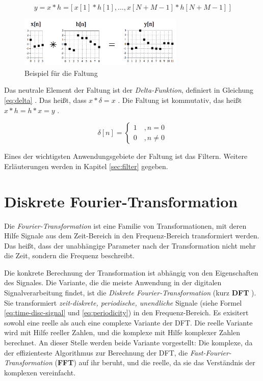 \begin{equation}
y = x * h = \big[ \: x[1] * h[1] , \ldots , x[N+M-1] * h[N+M-1] \: \big]
\label{eq:convolution}
\end{equation}

\begin{figure}[h]
	\centering
	\includegraphics[width=0.7\textwidth]{bilder/convolutionExample.png}
	\caption{Beispiel für die Faltung}
	\label{img:convolutionExample}
\end{figure}

Das neutrale Element der Faltung ist der \emph{Delta-Funktion}, definiert in Gleichung \ref{eq:delta} . Das heißt, dass $x * \delta = x$ . Die Faltung ist kommutativ, das heißt $ x * h = h * x = y$ . \cite[S. 107, 113 ]{dspGuide}

\begin{equation}
\delta[n] = 
\begin{cases}
1 \quad , n = 0\\
0 \quad ,  n \neq 0
\label{eq:delta}
\end{cases}
\end{equation}

Eines der wichtigsten Anwendungsgebiete der Faltung ist das Filtern. Weitere Erläuterungen werden in Kapitel \ref{sec:filter} gegeben.


\section{Diskrete Fourier-Transformation}

Die \emph{Fourier-Transformation} ist eine Familie von Transformationen, mit deren Hilfe Signale aus dem Zeit-Bereich in den Frequenz-Bereich transformiert werden. Das heißt, dass der unabhängige Parameter nach der Transformation nicht mehr die Zeit, sondern die Frequenz beschreibt. 

Die konkrete Berechnung der Transformation ist abhängig von den Eigenschaften des Signales. Die Variante, die die meiste Anwendung in der digitalen Signalverarbeitung findet, ist die \emph{Diskrete Fourier-Transformation} (kurz \textbf{DFT} ). Sie transformiert \emph{zeit-diskrete, periodische, unendliche} Signale (siehe Formel \ref{eq:time-disc-signal} und \ref{eq:periodicity}) in den Frequenz-Bereich. Es exisitert sowohl eine reelle als auch eine complexe Variante der DFT. Die reelle Variante wird mit Hilfe reeller Zahlen, und die komplexe mit Hilfe komplexer Zahlen berechnet. An dieser Stelle werden beide Variante vorgestellt: Die komplexe, da der effizienteste Algorithmus zur Berechnung der DFT, die \emph{Fast-Fourier-Transformation} (\textbf{FFT}) auf ihr beruht, und die reelle, da sie das Verständnis der komplexen vereinfacht.\cite[S. 142 - 146]{dspGuide}


